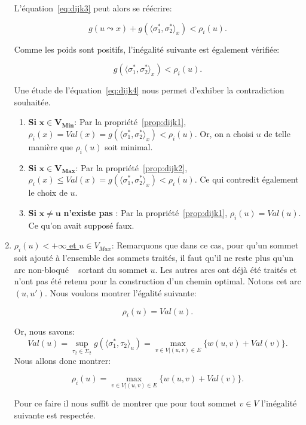 \begin{enumerate}
L'équation~\eqref{eq:dijk3} peut alors se réécrire: 

$$ g( u \leadsto x) + g(\langle \sigma_1^*, \sigma_2^* \rangle_x) < \rho_i(u).$$

Comme les poids sont positifs, l'inégalité suivante est également vérifiée:

\begin{equation}
	g(\langle \sigma_1^*, \sigma_2^* \rangle_x) < \rho_i(u). \label{eq:dijk4}
\end{equation}

Une étude de l'équation~\eqref{eq:dijk4} nous permet d'exhiber la contradiction souhaitée.

\begin{enumerate}
	\item \textbf{Si }$\mathbf{x \in V_{Min}}$: Par la propriété~\ref{prop:dijk1}, $\rho_i(x) = Val(x) = g(\langle \sigma_1^*, \sigma_2^* \rangle_x) < \rho_i(u)$. Or, on a choisi $u$ de telle manière que $\rho_i(u)$ soit minimal. 
	\item \textbf{Si }$\mathbf{x \in V_{Max}}$:	 Par la propriété~\ref{prop:dijk2}, $\rho_i(x) \leq Val(x) = g(\langle \sigma_1^*, \sigma_2^* \rangle_x) < \rho_i(u) $. Ce qui contredit également le choix de $u$.
	\item \textbf{Si }$\mathbf{x \neq u}$\textbf{ n'existe pas }: Par la propriété~\ref{prop:dijk1}, $\rho_i(u) = Val(u)$. Ce qu'on avait supposé faux.
\end{enumerate}

\item\underline{$\rho_i(u) < +\infty$ et $u \in V_{Max}$}: Remarquons que dans ce cas, pour qu'un sommet soit ajouté à l'ensemble des sommets traités, il faut qu'il ne reste plus qu'un arc \og non-bloqué \fg~ sortant du sommet $u$. Les autres arcs ont déjà été traités et n'ont pas été retenu pour la construction d'un chemin optimal. Notons cet arc $(u,u')$. Nous voulons montrer l'égalité suivante:

$$ \rho_i(u) = Val(u) .$$

Or, nous savons: 
$$ Val(u) = \sup _{\tau_2 \in \Sigma_2 } g( \langle \sigma^*_1, \tau_2 \rangle_u) = \max_{v \in V | (u,v) \in E} \{ w(u,v) + Val(v) \} .$$
Nous allons donc montrer:

\begin{equation*}
	\rho_i(u) = \max_{v \in V | (u,v) \in E} \{ w(u,v) + Val(v) \}.
\end{equation*}

Pour ce faire il nous suffit de montrer que pour tout sommet $v \in V$ l'inégalité suivante est respectée.


\end{enumerate}
